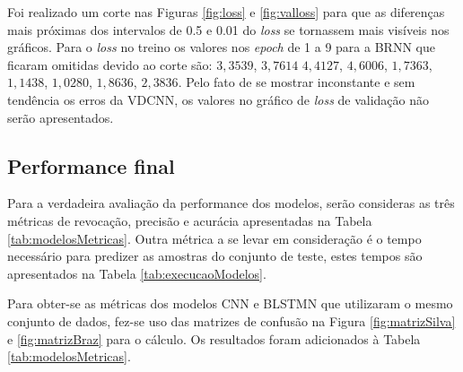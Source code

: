 Foi realizado um corte nas Figuras \ref{fig:loss} e \ref{fig:valloss} para que as diferenças mais próximas dos intervalos de 0.5 e 0.01 do \textit{loss} se tornassem mais visíveis nos gráficos. Para o \textit{loss} no treino os valores nos \textit{epoch} de 1 a 9 para a BRNN que ficaram omitidas devido ao corte são: $3,3539$,	$3,7614$	$4,4127$, $4,6006$, $1,7363$, $1,1438$, $1,0280$, $1,8636$, $2,3836$. Pelo fato de se mostrar inconstante e sem tendência os erros da VDCNN, os valores no gráfico de \textit{loss} de validação não serão apresentados.

\subsection{Performance final}

Para a verdadeira avaliação da performance dos modelos, serão consideras as três métricas de revocação, precisão e acurácia apresentadas na Tabela \ref{tab:modelosMetricas}. Outra métrica a se levar em consideração é o tempo necessário para predizer as amostras do conjunto de teste, estes tempos são apresentados na Tabela \ref{tab:execucaoModelos}.

Para obter-se as métricas dos modelos CNN \cite{da_silva_document_2018} e BLSTMN \cite{braz_document_2018} que utilizaram o mesmo conjunto de dados, fez-se uso das matrizes de confusão na Figura \ref{fig:matrizSilva} e \ref{fig:matrizBraz} para o cálculo. Os resultados foram adicionados à Tabela \ref{tab:modelosMetricas}. 

